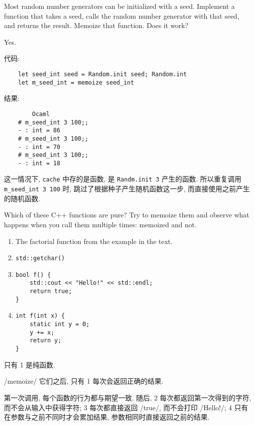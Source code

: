 \documentclass[lang=cn]{elegantbook}
\begin{document}
\begin{exercise}
Most random number generators can be initialized with a seed. Implement a function that takes a seed, calls the random number generator with that seed, and returns the result. Memoize that function. Does it work?
\end{exercise}

\begin{solution}

Yes.

代码:
\begin{verbatim}
    let seed_int seed = Random.init seed; Random.int
    let m_seed_int = memoize seed_int  
\end{verbatim}

结果:
\begin{verbatim}
        Ocaml
    # m_seed_int 3 100;;
    - : int = 86
    # m_seed_int 3 100;;
    - : int = 70
    # m_seed_int 3 100;;
    - : int = 18
\end{verbatim}

这一情况下, \texttt{cache} 中存的是函数, 是 \texttt{Randm.init 3} 产生的函数. 所以重复调用 \texttt{m_seed_int 3 100} 时, 跳过了根据种子产生随机函数这一步, 而直接使用之前产生的随机函数.

\end{solution}

\begin{exercise}
Which of these C++ functions are pure? Try to memoize them and observe what happens when you call them multiple times: memoized and not.
\begin{enumerate}
    \item The factorial function from the example in the text.
    \item \texttt{std::getchar()}
    \item \begin{verbatim}
bool f() {
    std::cout << "Hello!" << std::endl;
    return true;
}
    \end{verbatim}
    \item \begin{verbatim}
int f(int x) {
    static int y = 0;
    y += x;
    return y;
}
    \end{verbatim}
\end{enumerate}
\end{exercise}

\begin{solution}

只有 1 是纯函数.

\ocamlinline/memoize/ 它们之后, 只有 1 每次会返回正确的结果.

第一次调用, 每个函数的行为都与期望一致. 随后, 2 每次都返回第一次得到的字符, 而不会从输入中获得字符; 3 每次都直接返回 \cppinline/true/, 而不会打印 \cppinline/Hello!/; 4 只有在参数与之前不同时才会累加结果, 参数相同时直接返回之前的结果.

\end{solution}
\end{document}
